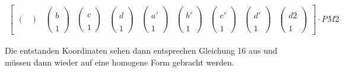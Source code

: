 \begin{gather}
\begin{bmatrix}
\begin{pmatrix}
\end{pmatrix}&
\begin{pmatrix}
\\b\\\\1
\end{pmatrix}&
\begin{pmatrix}
\\c\\\\1
\end{pmatrix}&
\begin{pmatrix}
\\d\\\\1
\end{pmatrix}&
\begin{pmatrix}
\\a'\\\\1
\end{pmatrix}&
\begin{pmatrix}
\\b'\\\\1
\end{pmatrix}&
\begin{pmatrix}
\\c'\\\\1
\end{pmatrix}&
\begin{pmatrix}
\\d'\\\\1
\end{pmatrix}&
\begin{pmatrix}
\\d2\\\\1
\end{pmatrix}
\end{bmatrix}
\cdot
PM2
\end{gather}

Die entstanden Koordinaten sehen dann entsprechen Gleichung 16 aus und müssen dann wieder auf eine homogene Form gebracht werden. 

